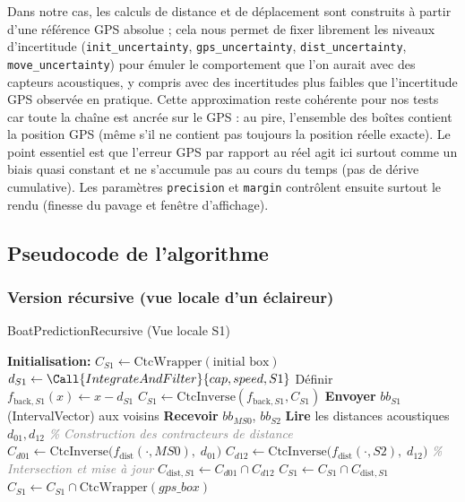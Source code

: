 Dans notre cas, les calculs de distance et de déplacement sont construits à partir d'une référence GPS absolue ; cela nous permet de fixer librement les niveaux d'incertitude (\texttt{init\_uncertainty}, \texttt{gps\_uncertainty}, \texttt{dist\_uncertainty}, \texttt{move\_uncertainty}) pour émuler le comportement que l'on aurait avec des capteurs acoustiques, y compris avec des incertitudes plus faibles que l'incertitude GPS observée en pratique. Cette approximation reste cohérente pour nos tests car toute la chaîne est ancrée sur le GPS : au pire, l'ensemble des boîtes contient la position GPS (même s'il ne contient pas toujours la position réelle exacte). Le point essentiel est que l'erreur GPS par rapport au réel agit ici surtout comme un biais quasi constant et ne s'accumule pas au cours du temps (pas de dérive cumulative). Les paramètres \texttt{precision} et \texttt{margin} contrôlent ensuite surtout le rendu (finesse du pavage et fenêtre d'affichage).

\subsection{Pseudocode de l'algorithme}

\subsubsection*{Version récursive (vue locale d'un éclaireur)}
\noindent
\begin{algo-box}[label=alg:recursive]{BoatPredictionRecursive (Vue locale S1)}
\begin{algorithmic}[1]
		\State \textbf{Initialisation:} $C_{S1} \gets \mathrm{CtcWrapper}(\text{initial box})$
		\Statex
				\State $d_{S1} \gets \Call{IntegrateAndFilter}{cap, speed, S1}$
				\State Définir $f_{\mathrm{back},S1}(x) \gets x - d_{S1}$
				\State $C_{S1} \gets \mathrm{CtcInverse}(f_{\mathrm{back},S1}, C_{S1})$
				\Statex
				\State \textbf{Envoyer} $bb_{S1}$ (IntervalVector) aux voisins
				\State \textbf{Recevoir} $bb_{MS0}$, $bb_{S2}$
				\State \textbf{Lire} les distances acoustiques $d_{01}, d_{12}$
				\Statex
				\State \textcolor{gray}{\itshape \% Construction des contracteurs de distance}
				\State $C_{d01} \gets \mathrm{CtcInverse}\bigl(f_{\mathrm{dist}}(\cdot,MS0),\;d_{01}\bigr)$
				\State $C_{d12} \gets \mathrm{CtcInverse}\bigl(f_{\mathrm{dist}}(\cdot,S2),\;d_{12}\bigr)$
				\Statex
				\State \textcolor{gray}{\itshape \% Intersection et mise à jour}
				\State $C_{\mathrm{dist},S1} \gets C_{d01} \cap C_{d12}$
				\State $C_{S1} \gets C_{S1} \cap C_{\mathrm{dist},S1}$
				\Statex
						\State $C_{S1} \gets C_{S1} \cap \mathrm{CtcWrapper}(gps\_box)$
				\EndIf
		\EndFor
\end{algorithmic}
\end{algo-box}

